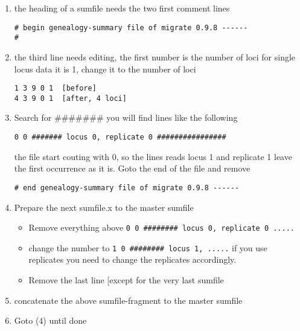 \begin{enumerate}
\item the heading of a sumfile needs the two first comment lines
\begin{verbatim}
# begin genealogy-summary file of migrate 0.9.8 ------
#
\end{verbatim}

\item the third line needs editing, the first number is the number of loci
for single locus data it is 1, change it to the number of loci
\begin{verbatim}
1 3 9 0 1  [before]
4 3 9 0 1  [after, 4 loci]
\end{verbatim}

\item Search for \#\#\#\#\#\#\# you will find  lines like the following
\begin{verbatim}
0 0 ####### locus 0, replicate 0 ################
\end{verbatim}

the file start couting with 0, so the lines reads locus 1 and replicate 1
leave the first occurrence as it is. Goto the end of the file and 
remove
\begin{verbatim}
# end genealogy-summary file of migrate 0.9.8 ------
\end{verbatim}

\item Prepare the next sumfile.x to the master sumfile
    \begin{itemize}
    \item Remove everything above \texttt{0 0 \#\#\#\#\#\#\#\# locus 0, replicate 0 .....} 
    \item change the number to    \texttt{1 0 \#\#\#\#\#\#\#\# locus 1, .....}
      if you use replicates you need to change the replicates accordingly.
    \item Remove the last line [except for the very last sumfile
    \end{itemize}
\item concatenate the above sumfile-fragment to the master sumfile

\item Goto (4) until done 
\end{enumerate}
   

\newpage
